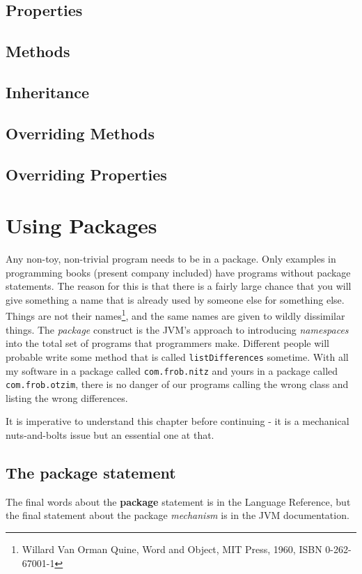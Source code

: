 {\section{Properties}
\section{Methods}
\section{Inheritance}
\section{Overriding Methods}
\section{Overriding Properties}
\chapter{Using Packages}
Any non-toy, non-trivial program needs to be in a package. Only
examples in programming books (present company included) have programs
without package statements. The reason
for this is that there is a fairly large chance that you will give
something a name that is already used by someone else for something
else. Things are not their names\footnote{Willard Van Orman Quine, Word
  and Object, MIT Press, 1960, ISBN 0-262-67001-1}, and the same names
are given to wildly dissimilar things. The \emph{package} construct is the JVM's approach to
introducing \emph{namespaces} into the total set of programs that
programmers make. Different people will probable write some method that is
called \texttt{listDifferences} sometime. With all my software in a
package called \texttt{com.frob.nitz} and yours in a package
called \texttt{com.frob.otzim}, there is no danger of our programs
calling the wrong class and listing the wrong differences.

It is imperative to understand this chapter before continuing - it is
a mechanical nuts-and-bolts issue but an essential one at that.

\section{The package statement}
The final words about the \nr{} \textbf{package} statement is in the
\nr{} Language Reference, but the final statement about the package
\emph{mechanism} is in the JVM documentation.
}
